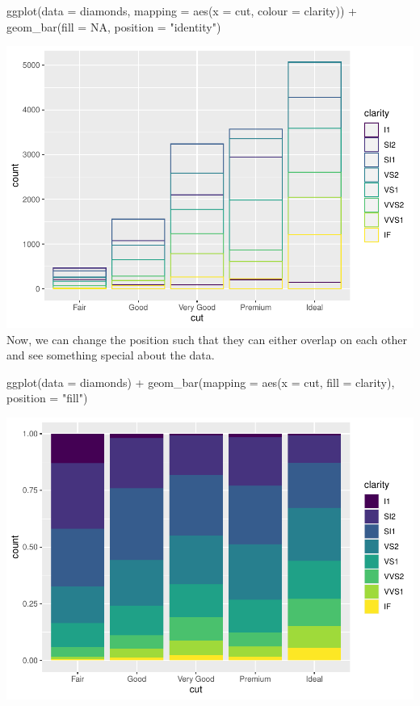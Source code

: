 \documentclass[
]{article}
\newenvironment{Shaded}{\begin{snugshade}}{\end{snugshade}}
\newcommand{\AttributeTok}[1]{\textcolor[rgb]{0.77,0.63,0.00}{#1}}
\newcommand{\ConstantTok}[1]{\textcolor[rgb]{0.00,0.00,0.00}{#1}}
\newcommand{\FunctionTok}[1]{\textcolor[rgb]{0.00,0.00,0.00}{#1}}
\newcommand{\NormalTok}[1]{#1}
\newcommand{\SpecialCharTok}[1]{\textcolor[rgb]{0.00,0.00,0.00}{#1}}
\newcommand{\StringTok}[1]{\textcolor[rgb]{0.31,0.60,0.02}{#1}}
\begin{document}
\begin{Shaded}
\begin{Highlighting}[]
\FunctionTok{ggplot}\NormalTok{(}\AttributeTok{data =}\NormalTok{ diamonds, }\AttributeTok{mapping =} \FunctionTok{aes}\NormalTok{(}\AttributeTok{x =}\NormalTok{ cut, }\AttributeTok{colour =}\NormalTok{ clarity)) }\SpecialCharTok{+} 
  \FunctionTok{geom\_bar}\NormalTok{(}\AttributeTok{fill =} \ConstantTok{NA}\NormalTok{, }\AttributeTok{position =} \StringTok{"identity"}\NormalTok{)}
\end{Highlighting}
\end{Shaded}

\includegraphics{Journal_files/figure-latex/unnamed-chunk-54-5.pdf} Now,
we can change the position such that they can either overlap on each
other and see something special about the data.

\begin{Shaded}
\begin{Highlighting}[]
\FunctionTok{ggplot}\NormalTok{(}\AttributeTok{data =}\NormalTok{ diamonds) }\SpecialCharTok{+} 
  \FunctionTok{geom\_bar}\NormalTok{(}\AttributeTok{mapping =} \FunctionTok{aes}\NormalTok{(}\AttributeTok{x =}\NormalTok{ cut, }\AttributeTok{fill =}\NormalTok{ clarity), }\AttributeTok{position =} \StringTok{"fill"}\NormalTok{)}
\end{Highlighting}
\end{Shaded}

\includegraphics{Journal_files/figure-latex/unnamed-chunk-55-1.pdf}
\end{document}
